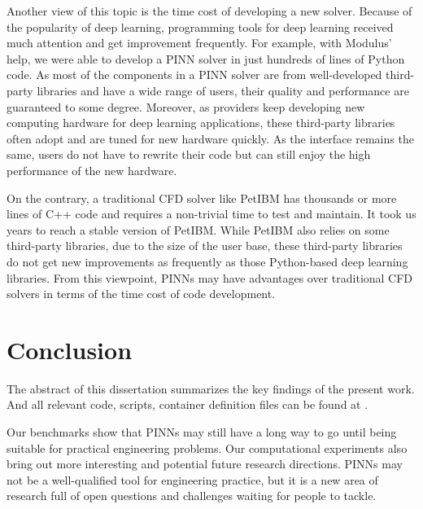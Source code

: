 Another view of this topic is the time cost of developing a new solver. 
Because of the popularity of deep learning, programming tools for deep learning received much attention and get improvement frequently.
For example, with Modulus' help, we were able to develop a PINN solver in just hundreds of lines of Python code.
As most of the components in a PINN solver are from well-developed third-party libraries and have a wide range of users, their quality and performance are guaranteed to some degree.
Moreover, as providers keep developing new computing hardware for deep learning applications, these third-party libraries often adopt and are tuned for new hardware quickly.
As the interface remains the same, users do not have to rewrite their code but can still enjoy the high performance of the new hardware.

On the contrary, a traditional CFD solver like PetIBM has thousands or more lines of C++ code and requires a non-trivial time to test and maintain.
It took us years to reach a stable version of PetIBM.
While PetIBM also relies on some third-party libraries, due to the size of the user base, these third-party libraries do not get new improvements as frequently as those Python-based deep learning libraries.
From this viewpoint, PINNs may have advantages over traditional CFD solvers in terms of the time cost of code development.

\section{Conclusion}

The abstract of this dissertation summarizes the key findings of the present work.
And all relevant code, scripts, container definition files can be found at \cite{chuang_dissertation_nodate}.

Our benchmarks show that PINNs may still have a long way to go until being suitable for practical engineering problems.
Our computational experiments also bring out more interesting and potential future research directions.
PINNs may not be a well-qualified tool for engineering practice, but it is a new area of research full of open questions and challenges waiting for people to tackle.

